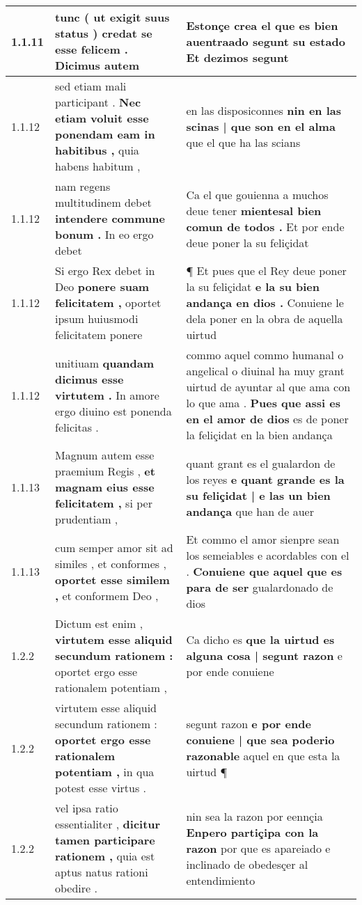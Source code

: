 \begin{tabular}{|p{1cm}|p{6.5cm}|p{6.5cm}|}
1.1.11 & tunc ( ut exigit suus status ) \textbf{ credat se esse felicem . } Dicimus autem & Estonçe crea el \textbf{ que es bien auentraado segunt su estado } Et dezimos segunt \\\hline
1.1.12 & sed etiam mali participant . \textbf{ Nec etiam voluit esse ponendam eam in habitibus , } quia habens habitum , & en las disposiconnes \textbf{ nin en las scinas | que son en el alma } que el que ha las scians \\\hline
1.1.12 & nam regens multitudinem debet \textbf{ intendere commune bonum . } In eo ergo debet & Ca el que gouienna a muchos deue tener \textbf{ mientesal bien comun de todos . } Et por ende deue poner la su feliçidat \\\hline
1.1.12 & Si ergo Rex debet in Deo \textbf{ ponere suam felicitatem , } oportet ipsum huiusmodi felicitatem ponere & ¶ Et pues que el Rey deue poner la su feliçidat \textbf{ e la su bien andança en dios . } Conuiene le dela poner en la obra de aquella uirtud \\\hline
1.1.12 & unitiuam \textbf{ quandam dicimus esse virtutem . } In amore ergo diuino est ponenda felicitas . & commo aquel commo humanal o angelical o diuinal ha muy grant uirtud de ayuntar al que ama con lo que ama . \textbf{ Pues que assi es en el amor de dios } es de poner la feliçidat en la bien andança \\\hline
1.1.13 & Magnum autem esse praemium Regis , \textbf{ et magnam eius esse felicitatem , } si per prudentiam , & quant grant es el gualardon de los reyes \textbf{ e quant grande es la su feliçidat | e las un bien andança } que han de auer \\\hline
1.1.13 & cum semper amor sit ad similes , et conformes , \textbf{ oportet esse similem , } et conformem Deo , & Et commo el amor sienpre sean los semeiables e acordables con el . \textbf{ Conuiene que aquel que es para de ser } gualardonado de dios \\\hline
1.2.2 & Dictum est enim , \textbf{ virtutem esse aliquid secundum rationem : } oportet ergo esse rationalem potentiam , & Ca dicho es \textbf{ que la uirtud es alguna cosa | segunt razon } e por ende conuiene \\\hline
1.2.2 & virtutem esse aliquid secundum rationem : \textbf{ oportet ergo esse rationalem potentiam , } in qua potest esse virtus . & segunt razon \textbf{ e por ende conuiene | que sea poderio razonable } aquel en que esta la uirtud ¶ \\\hline
1.2.2 & vel ipsa ratio essentialiter , \textbf{ dicitur tamen participare rationem , } quia est aptus natus rationi obedire . & nin sea la razon por eennçia \textbf{ Enpero partiçipa con la razon } por que es apareiado e inclinado de obedesçer al entendimiento \\\hline

\end{tabular}
